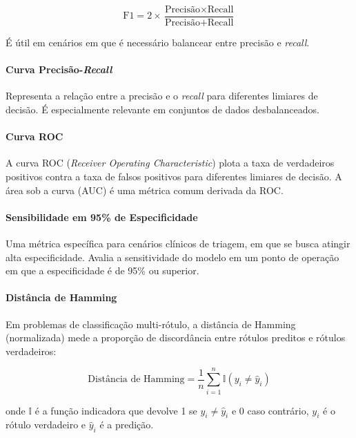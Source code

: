 \documentclass[12pt]{article}
\begin{document}
\begin{equation}
\text{F1} = 2 \times \frac{\text{Precisão} \times \text{Recall}}{\text{Precisão} + \text{Recall}}
\end{equation}

É útil em cenários em que é necessário balancear entre precisão e \emph{recall}.

\paragraph{Curva Precisão-\emph{Recall}} Representa a relação entre a precisão e o \emph{recall} para diferentes limiares de decisão. É especialmente relevante em conjuntos de dados desbalanceados.

\paragraph{Curva ROC} A curva ROC (\emph{Receiver Operating Characteristic}) plota a taxa de verdadeiros positivos contra a taxa de falsos positivos para diferentes limiares de decisão. A área sob a curva (AUC) é uma métrica comum derivada da ROC.

\paragraph{Sensibilidade em 95\% de Especificidade} Uma métrica específica para cenários clínicos de triagem, em que se busca atingir alta especificidade. Avalia a sensitividade do modelo em um ponto de operação em que a especificidade é de 95\% ou superior.

\paragraph{Distância de Hamming}  
Em problemas de classificação multi-rótulo, a distância de Hamming (normalizada) mede a proporção de discordância entre rótulos preditos e rótulos verdadeiros:

\begin{equation}
\text{Distância de Hamming} = \frac{1}{n} \sum_{i=1}^{n} \mathbb{I}(y_i \neq \hat{y}_i)
\end{equation}

onde \( \mathbb{I} \) é a função indicadora que devolve 1 se \( y_i \neq \hat{y}_i \) e 0 caso contrário, \( y_i \) é o rótulo verdadeiro e \( \hat{y}_i \) é a predição.
\end{document}
